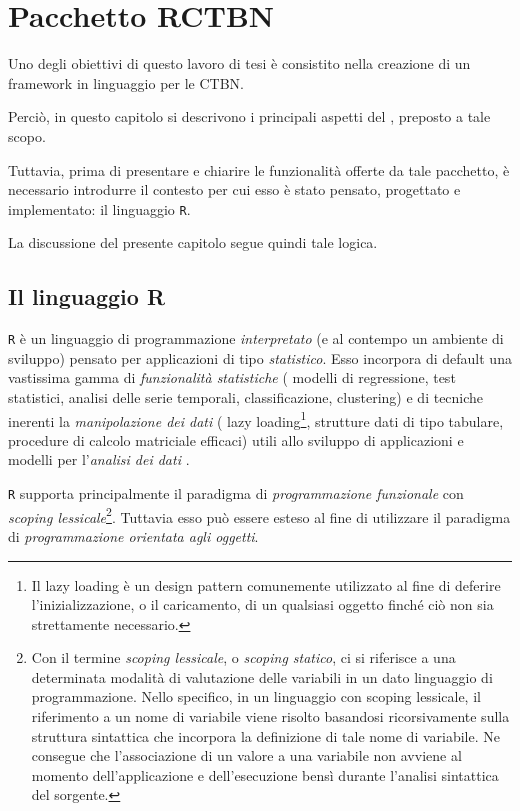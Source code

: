 
\chapter{Pacchetto RCTBN}
\label{cap:ctbnr}
Uno degli obiettivi di questo lavoro di tesi è consistito nella creazione di un framework in linguaggio  per le \acs{CTBN}.

Perciò, in questo capitolo si descrivono i principali aspetti del \pacchettor{}, preposto a tale scopo.

Tuttavia, prima di presentare e chiarire le funzionalità offerte da tale pacchetto, è necessario introdurre il contesto per cui esso è stato pensato, progettato e implementato: il linguaggio \lstinline$R$.

La discussione del presente capitolo segue quindi tale logica.

\section{Il linguaggio R}\label{sec:roverview}
\lstinline$R$ è un linguaggio di programmazione \emph{interpretato} (e al contempo un ambiente di sviluppo) pensato per applicazioni di tipo \emph{statistico}. Esso incorpora di default una vastissima gamma di \emph{funzionalità statistiche} (\eg{} modelli di regressione, test statistici, analisi delle serie temporali, classificazione, clustering) e di tecniche inerenti la \emph{manipolazione dei dati} (\eg{} lazy loading\footnote{Il lazy loading è un design pattern comunemente utilizzato al fine di deferire l'inizializzazione, o il caricamento, di un qualsiasi oggetto finché ciò non sia strettamente necessario.}, strutture dati di tipo tabulare, procedure di calcolo matriciale efficaci) utili allo sviluppo di applicazioni e modelli per l'\emph{analisi dei dati} \citep{R2013}.

\lstinline$R$ supporta principalmente il paradigma di \emph{programmazione funzionale} con \emph{scoping lessicale}\footnote{Con il termine \emph{scoping lessicale}, o \emph{scoping statico}, ci si riferisce a una determinata modalità di valutazione delle variabili in un dato linguaggio di programmazione. Nello specifico, in un linguaggio con scoping lessicale, il riferimento a un nome di variabile viene risolto basandosi ricorsivamente sulla struttura sintattica che incorpora la definizione di tale nome di variabile. Ne consegue che l'associazione di un valore a una variabile non avviene al momento dell'applicazione e dell'esecuzione bensì durante l'analisi sintattica del sorgente.}. Tuttavia esso può essere esteso al fine di utilizzare il paradigma di \emph{programmazione orientata agli oggetti}.

